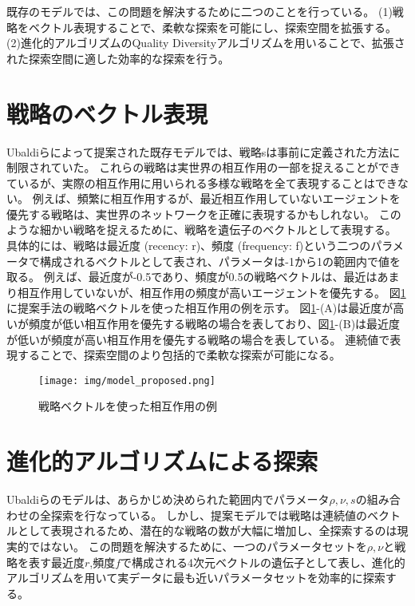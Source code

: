 \documentclass[uplatex,11pt,openany]{ujreport}
\begin{document}
    既存のモデルでは、この問題を解決するために二つのことを行っている。
    (1)戦略をベクトル表現することで、柔軟な探索を可能にし、探索空間を拡張する。
    (2)進化的アルゴリズムのQuality Diversityアルゴリズムを用いることで、拡張された探索空間に適した効率的な探索を行う。

    \section{戦略のベクトル表現}
        Ubaldiらによって提案された既存モデルでは、戦略sは事前に定義された方法に制限されていた。
        これらの戦略は実世界の相互作用の一部を捉えることができているが、実際の相互作用に用いられる多様な戦略を全て表現することはできない。
        例えば、頻繁に相互作用するが、最近相互作用していないエージェントを優先する戦略は、実世界のネットワークを正確に表現するかもしれない。
        このような細かい戦略を捉えるために、戦略を遺伝子のベクトルとして表現する。
        具体的には、戦略は最近度 (recency: r)、頻度 (frequency: f)という二つのパラメータで構成されるベクトルとして表され、パラメータは-1から1の範囲内で値を取る。
        例えば、最近度が-0.5であり、頻度が0.5の戦略ベクトルは、最近はあまり相互作用していないが、相互作用の頻度が高いエージェントを優先する。
        図\ref{fig:strategy}に提案手法の戦略ベクトルを使った相互作用の例を示す。
        図\ref{fig:strategy}-(A)は最近度が高いが頻度が低い相互作用を優先する戦略の場合を表しており、図\ref{fig:strategy}-(B)は最近度が低いが頻度が高い相互作用を優先する戦略の場合を表している。
        連続値で表現することで、探索空間のより包括的で柔軟な探索が可能になる。

        \begin{figure}[htbp]
            \centering
            \texttt{[image: img/model\_proposed.png]}
            \caption{戦略ベクトルを使った相互作用の例}
            \label{fig:strategy}
        \end{figure}

    \section{進化的アルゴリズムによる探索}
        Ubaldiらのモデルは、あらかじめ決められた範囲内でパラメータ$\rho,\nu,s$の組み合わせの全探索を行なっている。
        しかし、提案モデルでは戦略は連続値のベクトルとして表現されるため、潜在的な戦略の数が大幅に増加し、全探索するのは現実的ではない。
        この問題を解決するために、一つのパラメータセットを$\rho,\nu$と戦略を表す最近度$r$,頻度$f$で構成される4次元ベクトルの遺伝子として表し、進化的アルゴリズムを用いて実データに最も近いパラメータセットを効率的に探索する。
\end{document}
